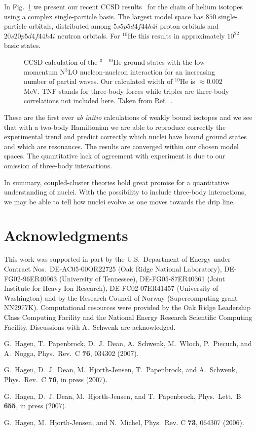 \documentclass{ws-procs975x65}
\begin{document}
In Fig.~\ref{fig:hechain} we present our recent CCSD results~\cite{hagen3}
for the chain
of helium isotopes using a complex single-particle basis.   
The largest model space has
$850$ single-particle orbitals, distributed among $5s5p5d4f44h4i$ proton orbitals
and  $20s20p5d4f44h4i$ neutron orbitals. For $^{10}$He this results in approximately $10^{22}$ basic states. 
\begin{figure}[t]%
\begin{center}
\caption{CCSD calculation of the $^{3-10}$He ground states with the
    low-momentum N$^3$LO nucleon-nucleon interaction for an increasing
    number of partial waves. Our calculated width of $^{10}$He is $\approx 0.002$MeV. TNF stands for three-body forces while
triples are three-body correlations not included here. Taken from Ref.~\cite{hagen3}.  \label{fig:hechain}}
\end{center}
\end{figure} 
These are the first ever {\em ab initio} calculations of weakly bound isotopes and we see that with a two-body Hamiltonian
we are able to reproduce correctly the experimental trend and predict correctly which nuclei have bound ground states and 
which are resonances.  The results are converged within our chosen model spaces.
The quantitative lack of agreement with experiment is due to our omission of three-body interactions.

In summary, coupled-cluster theories hold great promise for a quantitative understanding of nuclei. With the possibility
to include three-body interactions\cite{hagen1}, we may be able to 
tell how nuclei evolve as one moves towards the drip line.

\section{Acknowledgments}

This work was supported in part by the U.S.~Department
of Energy under Contract Nos.~DE-AC05-00OR22725 (Oak Ridge National
Laboratory), DE-FG02-96ER40963 (University of Tennessee),
DE-FG05-87ER40361 (Joint Institute for Heavy Ion Research), 
DE-FC02-07ER41457 (University of Washington)
and by the
Research Council of Norway (Supercomputing grant
NN2977K). Computational resources were provided by the Oak Ridge
Leadership Class Computing Facility and the National Energy Research
Scientific Computing Facility.  Discussions with A.~Schwenk are acknowledged.

\begin{thebibliography}{10}
G.~Hagen, T.~Papenbrock, D.~J.~Dean, A.~Schwenk, M.~W{\l}och, P.~Piecuch, and
  A.~Nogga, Phys.~Rev.~C {\bf 76}, 034302 (2007).

G.~Hagen, D.~J.~Dean, M.~Hjorth-Jensen, T.~Papenbrock, and A.~Schwenk, Phys.~Rev.~C {\bf 76}, in press (2007).

G.~Hagen, D.~J. Dean, M.~Hjorth-Jensen, and T.~Papenbrock, Phys.~Lett.~B {\bf 655}, in press (2007).

G.~Hagen, M.~Hjorth-Jensen, and N.~Michel, Phys.~Rev. C {\bf 73}, 064307 (2006).
\end{thebibliography}




\end{document}
